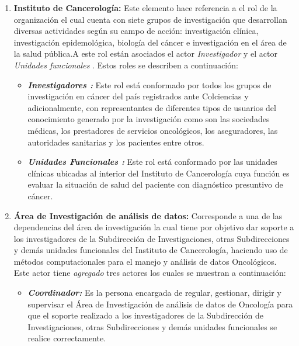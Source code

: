 \begin{enumerate}[label=\textbf{\arabic*})]
	
	\item  \textbf{\textbf{Instituto  de Cancerología}:} Este elemento hace referencia a el rol de la organización el cual cuenta con siete grupos de investigación que desarrollan diversas actividades según su campo de acción: investigación clínica, investigación epidemológica, biología del cáncer e investigación en el área de la salud pública.A este rol están asociados el actor \textit{Investigador } y el actor \textit{Unidades funcionales }. Estos roles se describen a continuación: 
	\begin{itemize}
		\item  \textbf{\textit{Investigadores :}}  Este rol está conformado por todos los grupos de investigación en cáncer del país registrados ante Colciencias y adicionalmente, con representantes de diferentes tipos de usuarios del conocimiento generado por la investigación como son las sociedades médicas, los prestadores de servicios oncológicos, los aseguradores, las autoridades sanitarias y los pacientes entre otros. 
		
		\item  \textbf{\textit{Unidades Funcionales :}}  Este rol está conformado por las unidades clínicas ubicadas al interior del Instituto  de Cancerología cuya función es evaluar la situación de salud del paciente con diagnóstico presuntivo de cáncer. 
	\end{itemize}
	
	\item \textbf{Área de Investigación de análisis de datos:} Corresponde a una de las dependencias del área de investigación la cual  tiene por objetivo dar soporte a los investigadores de la Subdirección de Investigaciones, otras Subdirecciones y demás unidades funcionales del Instituto  de Cancerología, haciendo uso de métodos computacionales para el manejo y análisis de datos Oncológicos. Este actor tiene \textit{agregado} tres actores los cuales se muestran a continuación:
	
	\begin{itemize}
		\item  \textbf{\textit{Coordinador:}}
		Es la persona encargada de regular, gestionar, dirigir y supervisar el Área de Investigación de análisis de datos de Oncología para que el soporte realizado a los investigadores de la Subdirección de Investigaciones, otras Subdirecciones y demás unidades funcionales se realice correctamente.
		

\end{itemize}
\end{enumerate}
